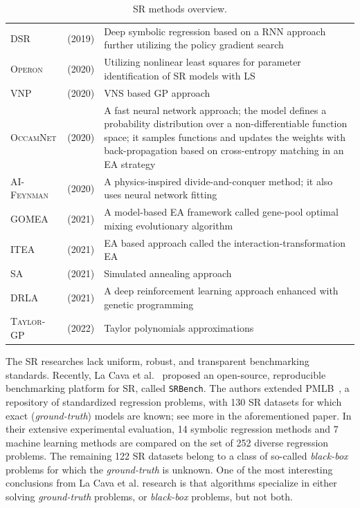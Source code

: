 \documentclass{bmcart}
\begin{document}
\begin{table}[!h]
{\begin{tabularx}{550pt}{l  l  X}
			\textsc{DSR}  & \cite{petersen2019deep} (2019) & Deep symbolic regression based on a RNN approach further utilizing the policy gradient search \\
			\textsc{Operon} & \cite{kommenda2020parameter} (2020) &  Utilizing nonlinear least squares for parameter identification of SR models with LS \\
			\textsc{VNP}    & \cite{elleuch2020variable} (2020) & VNS based GP approach \\
			\textsc{OccamNet} & \cite{costa2020fast} (2020) &   A fast neural network approach; the model defines a probability distribution over a non-differentiable function space; it samples functions and updates the weights with back-propagation  based on cross-entropy matching in an EA strategy	 \\
			
			\textsc{AI-Feynman} & \cite{udrescu2020ai} (2020) & A physics-inspired divide-and-conquer method; it also uses neural network fitting \\
			\textsc{GOMEA}  & \cite{virgolin2021improving} (2021)    & A model-based
			EA framework called gene-pool optimal mixing evolutionary algorithm \\
			\textsc{ITEA} & \cite{de2021interaction} (2021)   & EA based approach called the interaction-transformation EA   \\
			\textsc{SA} & \cite{kantor2021simulated} (2021) &  Simulated annealing approach \\
			
			\textsc{DRLA} & \cite{mundhenk2021symbolic} (2021)  &    A deep reinforcement learning approach enhanced with genetic programming \\
			\textsc{Taylor-GP} &  \cite{he2022taylor} (2022)  &  Taylor polynomials approximations  \\ \hline
			
			
	\end{tabularx} }
	\caption{SR methods overview.}
	\label{tab:gp-based}
\end{table}

	
The SR researches lack uniform, robust, and transparent
benchmarking standards. Recently, La Cava et al.~\cite{la2021contemporary} proposed an
open-source, reproducible benchmarking platform for SR, called \texttt{SRBench}. The authors extended  PMLB~\cite{olson2017pmlb},  a repository of standardized regression problems, with 130 SR datasets for which exact (\emph{ground-truth}) models are known; see more in the aforementioned paper. In their extensive experimental evaluation, 14
symbolic regression methods and 7 machine learning methods are compared on the set of 252 diverse regression problems. The remaining 122 SR datasets belong to a class of so-called \emph{black-box} problems for which the \emph{ground-truth} is unknown. One of the most interesting conclusions from La Cava et al. research is that algorithms specialize in either solving \emph{ground-truth} problems, or \emph{black-box} problems, but not both. 
\end{document}
